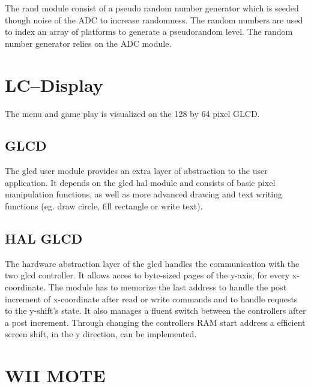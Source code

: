 \documentclass[12pt,a4paper,titlepage,oneside]{article}
\begin{document}
The rand module consist of a pseudo random number generator which is seeded
though noise of the ADC to increase randomness. The random numbers are used
to index an array of platforms to generate a pseudorandom level.
\noindent
The random number generator relies on the ADC module.

\section{LC--Display}

The menu and game play is visualized on the 128 by 64 pixel GLCD. 

\subsection{GLCD}

The glcd user module provides an extra layer of abstraction to the user 
application. It depends on the glcd hal module and consists of basic pixel
manipulation functions, as well as more advanced drawing and text writing 
functions (eg. draw circle, fill rectangle or write text). 

\subsection{HAL GLCD}

The hardware abstraction layer of the glcd handles the communication with 
the two glcd controller. It allows acces to byte-sized pages of the y-axis, for
every x-coordinate. The module has to memorize the last address to handle the
post increment of x-coordinate after read or write commands and to handle 
requests to the y-shift's state. It also manages a fluent switch between the 
controllers after a post increment. Through changing the controllers RAM start
address a efficient screen shift, in the y direction, can be implemented. 

\section{WII MOTE}
\end{document}
